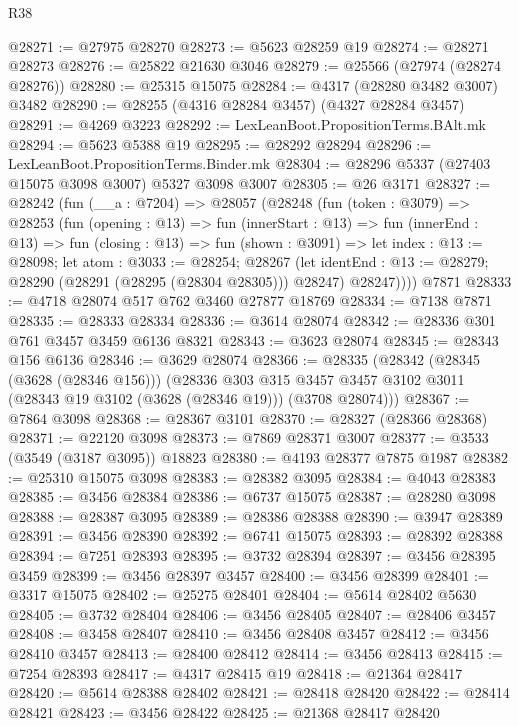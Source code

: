 \begin{lexlean}{R38}
\begin{coremodule}
@28271 := @27975 @28270
@28273 := @5623 @28259 @19
@28274 := @28271 @28273
@28276 := @25822 @21630 @3046
@28279 := @25566 (@27974 (@28274 @28276))
@28280 := @25315 @15075
@28284 := @4317 (@28280 @3482 @3007) @3482
@28290 := @28255 (@4316 @28284 @3457) (@4327 @28284 @3457)
@28291 := @4269 @3223
@28292 := LexLeanBoot.PropositionTerms.BAlt.mk
@28294 := @5623 @5388 @19
@28295 := @28292 @28294
@28296 := LexLeanBoot.PropositionTerms.Binder.mk
@28304 := @28296 @5337 (@27403 @15075 @3098 @3007) @5327 @3098 @3007
@28305 := @26 @3171
@28327 := @28242
    (fun (__a : @7204) =>
    @28057
      (@28248
        (fun (token : @3079) =>
        @28253
          (fun (opening : @13) =>
          fun (innerStart : @13) =>
          fun (innerEnd : @13) =>
          fun (closing : @13) =>
          fun (shown : @3091) =>
          let index : @13 := @28098;
          let atom : @3033 := @28254;
          @28267
            (let identEnd : @13 := @28279; @28290 (@28291 (@28295 (@28304 @28305))) @28247)
            @28247))))
    @7871
@28333 := @4718 @28074 @517 @762 @3460 @27877 @18769
@28334 := @7138 @7871
@28335 := @28333 @28334
@28336 := @3614 @28074
@28342 := @28336 @301 @761 @3457 @3459 @6136 @8321
@28343 := @3623 @28074
@28345 := @28343 @156 @6136
@28346 := @3629 @28074
@28366 := @28335
    (@28342
      (@28345 (@3628 (@28346 @156)))
      (@28336
        @303
        @315
        @3457
        @3457
        @3102
        @3011
        (@28343 @19 @3102 (@3628 (@28346 @19)))
        (@3708 @28074)))
@28367 := @7864 @3098
@28368 := @28367 @3101
@28370 := @28327 (@28366 @28368)
@28371 := @22120 @3098
@28373 := @7869 @28371 @3007
@28377 := @3533 (@3549 (@3187 @3095)) @18823
@28380 := @4193 @28377 @7875 @1987
@28382 := @25310 @15075 @3098
@28383 := @28382 @3095
@28384 := @4043 @28383
@28385 := @3456 @28384
@28386 := @6737 @15075
@28387 := @28280 @3098
@28388 := @28387 @3095
@28389 := @28386 @28388
@28390 := @3947 @28389
@28391 := @3456 @28390
@28392 := @6741 @15075
@28393 := @28392 @28388
@28394 := @7251 @28393
@28395 := @3732 @28394
@28397 := @3456 @28395 @3459
@28399 := @3456 @28397 @3457
@28400 := @3456 @28399
@28401 := @3317 @15075
@28402 := @25275 @28401
@28404 := @5614 @28402 @5630
@28405 := @3732 @28404
@28406 := @3456 @28405
@28407 := @28406 @3457
@28408 := @3458 @28407
@28410 := @3456 @28408 @3457
@28412 := @3456 @28410 @3457
@28413 := @28400 @28412
@28414 := @3456 @28413
@28415 := @7254 @28393
@28417 := @4317 @28415 @19
@28418 := @21364 @28417
@28420 := @5614 @28388 @28402
@28421 := @28418 @28420
@28422 := @28414 @28421
@28423 := @3456 @28422
@28425 := @21368 @28417 @28420

\end{coremodule}
\end{lexlean}
